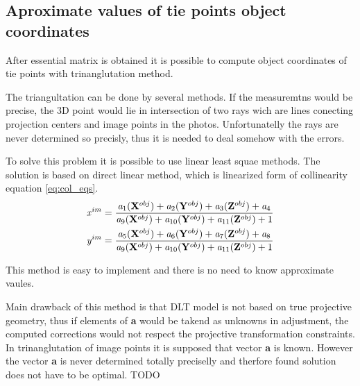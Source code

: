\documentclass[a4paper,12pt]{report}
\newcommand{\evect}[1]{
{\bf #1}
}
\newcommand{\escal}[1]{
{\it #1}
}
\begin{document}
\begin{itemize}
\subsection{Aproximate values  of tie points object coordinates}

After essential matrix is obtained it is possible to compute object coordinates of tie points with trinanglutation
method.

The triangultation can be done by several methods. If the measuremtns would be precise, the 3D point 
would lie in intersection of two rays wich are lines conecting projection centers and image points 
in the photos. Unfortunatelly the rays are never determined so precisly, thus it is needed to deal 
somehow with the errors. 

To solve this problem it is possible to use linear least squae methods. The solution is based 
on direct linear method, which is linearized form of collinearity equation \eqref{eq:col_eqs}.
\begin{equation}
\label{eq:col_eqs}
\begin{split}
&\escal{x}^{im} = \frac{\escal{a}_{1}(\evect{X}^{obj}) + 
                                  \escal{a}_{2}(\evect{Y}^{obj}) + 
                                  \escal{a}_{3}(\evect{Z}^{obj}) +
                                  \escal{a}_{4}
                                  }{
				  \escal{a}_{9}(\evect{X}^{obj}) + 
                                  \escal{a}_{10}(\evect{Y}^{obj}) + 
                                  \escal{a}_{11}(\evect{Z}^{obj}) +
                                   1  
                                  } \\
&\escal{y}^{im} = \frac{\escal{a}_{5}(\evect{X}^{obj}) + 
                                  \escal{a}_{6}(\evect{Y}^{obj}) + 
                                  \escal{a}_{7}(\evect{Z}^{obj}) +                                 
                                  \escal{a}_{8}
                                  }{
				  \escal{a}_{9}(\evect{X}^{obj}) + 
                                  \escal{a}_{10}(\evect{Y}^{obj}) + 
                                  \escal{a}_{11}(\evect{Z}^{obj}) +    
                                  1
                                  }
\end{split}
\end{equation}

This method is easy to implement and there is no need to know approximate vaules.


Main drawback of this method is that DLT model is not based on true projective geometry, thus 
if elements of \evect{a} would be takend as unknowns in adjustment, the computed corrections 
would not respect the projective transformation constraints.  In trinanglutation of image points 
it is supposed that vector \evect{a} is known. However the vector \evect{a} is never determined 
totally preciselly and therfore found solution does not have to be optimal.
TODO


\end{itemize}
\end{document}
